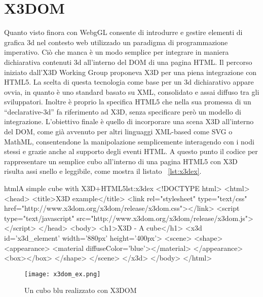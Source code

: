 \section{X3DOM}
Quanto visto finora con WebgGL consente di introdurre e gestire elementi di grafica 3d nel contesto web utilizzado un paradigma di programmazione imperativo. Ciò che manca è un modo semplice per integrare in maniera dichiarativa contenuti 3d all'interno del DOM di una pagina HTML. Il percorso iniziato dall'X3D Working Group proponeva X3D per una piena integrazione con HTML5. La scelta di questa tecnologia come base per un 3d dichiarativo appare ovvia, in quanto è uno standard basato su XML, consolidato e assai diffuso tra gli sviluppatori. Inoltre è proprio la specifica HTML5 che nella sua promessa di un ``declarative-3d'' fa riferimento ad X3D, senza specificare però un modello di integrazione. L'obiettivo finale è quello di incorporare una scena X3D all'interno del DOM, come già avvenuto per altri linguaggi XML-based come SVG o MathML, consentendone la manipolazione semplicemente interagendo con i nodi stessi e grazie anche al supporto degli eventi HTML. A questo punto il codice per rappresentare un semplice cubo all'interno di una pagina HTML5 con X3D risulta assi snello e leggibile, come mostra il listato ~\ref{lst:x3dex}.

\begin{mylisting}{html}{A simple cube with X3D+HTML5}{lst:x3dex}
<!DOCTYPE html>
<html>
<head>
<title>X3D example</title>
<link rel="stylesheet" type="text/css" href="http://www.x3dom.org/x3dom/release/x3dom.css"></link>
<script type="text/javascript" src="http://www.x3dom.org/x3dom/release/x3dom.js"></script>
</head>
<body>
    <h1>X3D - A cube</h1>
    <x3d id='x3d_element' width='880px' height='400px'>
        <scene>
            <shape>
                <appearance>
                    <material diffuseColor='blue'></material>
                </appearance>
                <box></box>
            </shape>
        </scene>
    </x3d>
</body>
</html>
\end{mylisting}

\begin{figure}[Ht]
\centering
\texttt{[image: x3dom\_ex.png]}
\caption{Un cubo blu realizzato con X3DOM}
\label{label:x3domex}
\end{figure}

